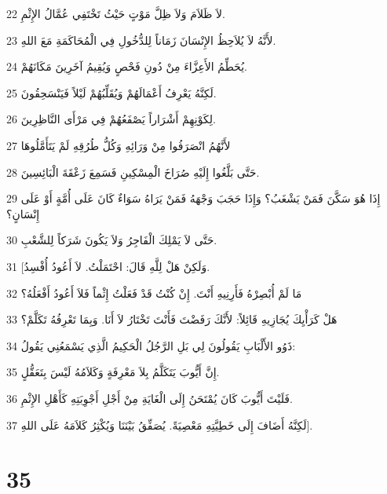 \par 22 لاَ ظَلاَمَ وَلاَ ظِلَّ مَوْتٍ حَيْثُ تَخْتَفِي عُمَّالُ الإِثْمِ.
\par 23 لأَنَّهُ لاَ يُلاَحِظُ الإِنْسَانَ زَمَاناً لِلدُّخُولِ فِي الْمُحَاكَمَةِ مَعَ اللهِ.
\par 24 يُحَطِّمُ الأَعِزَّاءَ مِنْ دُونِ فَحْصٍ وَيُقِيمُ آخَرِينَ مَكَانَهُمْ.
\par 25 لَكِنَّهُ يَعْرِفُ أَعْمَالَهُمْ وَيُقَلِّبُهُمْ لَيْلاً فَيَنْسَحِقُونَ.
\par 26 لِكَوْنِهِمْ أَشْرَاراً يَصْفَعُهُمْ فِي مَرْأَى النَّاظِرِينَ.
\par 27 لأَنَّهُمُ انْصَرَفُوا مِنْ وَرَائِهِ وَكُلُّ طُرُقِهِ لَمْ يَتَأَمَّلُوهَا
\par 28 حَتَّى بَلَّغُوا إِلَيْهِ صُرَاخَ الْمِسْكِينِ فَسَمِعَ زَعْقَةَ الْبَائِسِينَ.
\par 29 إِذَا هُوَ سَكَّنَ فَمَنْ يَشْغَبُ؟ وَإِذَا حَجَبَ وَجْهَهُ فَمَنْ يَرَاهُ سَوَاءٌ كَانَ عَلَى أُمَّةٍ أَوْ عَلَى إِنْسَانٍ؟
\par 30 حَتَّى لاَ يَمْلِكَ الْفَاجِرُ وَلاَ يَكُونَ شَرَكاً لِلشَّعْبِ.
\par 31 [وَلَكِنْ هَلْ لِلَّهِ قَالَ: احْتَمَلْتُ. لاَ أَعُودُ أُفْسِدُ.
\par 32 مَا لَمْ أُبْصِرْهُ فَأَرِنِيهِ أَنْتَ. إِنْ كُنْتُ قَدْ فَعَلْتُ إِثْماً فَلاَ أَعُودُ أَفْعَلُهُ؟
\par 33 هَلْ كَرَأْيِكَ يُجَازِيهِ قَائِلاً: لأَنَّكَ رَفَضْتَ فَأَنْتَ تَخْتَارُ لاَ أَنَا. وَبِمَا تَعْرِفُهُ تَكَلَّمْ؟
\par 34 ذَوُو الأَلْبَابِ يَقُولُونَ لِي بَلِ الرَّجُلُ الْحَكِيمُ الَّذِي يَسْمَعُنِي يَقُولُ:
\par 35 إِنَّ أَيُّوبَ يَتَكَلَّمُ بِلاَ مَعْرِفَةٍ وَكَلاَمُهُ لَيْسَ بِتَعَقُّلٍ.
\par 36 فَلَيْتَ أَيُّوبَ كَانَ يُمْتَحَنُ إِلَى الْغَايَةِ مِنْ أَجْلِ أَجْوِبَتِهِ كَأَهْلِ الإِثْمِ.
\par 37 لَكِنَّهُ أَضَافَ إِلَى خَطِيَّتِهِ مَعْصِيَةً. يُصَفِّقُ بَيْنَنَا وَيُكْثِرُ كَلاَمَهُ عَلَى اللهِ].

\chapter{35}

